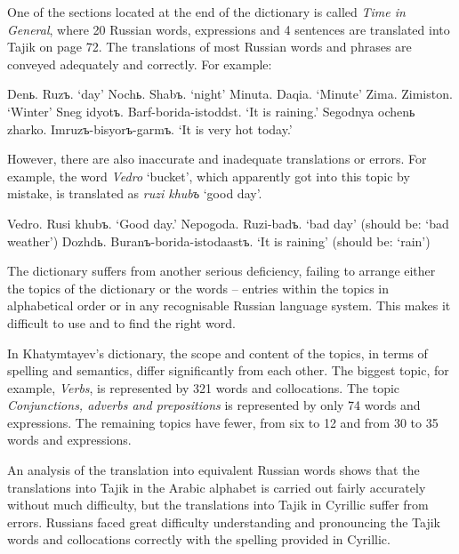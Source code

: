 \documentclass[output=paper,colorlinks,citecolor=brown,arabicfont,chinesefont]{langscibook}
\begin{document}
One of the sections located at the end of the dictionary is called \emph{Time in General}, where 20 Russian words, expressions and 4 sentences are translated into Tajik on page 72. The translations of most Russian words and phrases are conveyed adequately and correctly. For example:

\ea
    \ea Denь. 		Ruzъ.
        \glt `day' 		
    \ex Nochь. 		Shabъ.
        \glt `night'  		 
    \ex Minuta. 		Daqia.
        \glt `Minute' 		
    \ex Zima. 		Zimiston.
        \glt `Winter'  		  
    \ex Sneg idyotъ. 	Barf-borida-istoddst.
        \glt `It is raining.'  
    \ex Segodnya ochenь zharko.  Imruzъ-bisyorъ-garmъ.
        \glt `It is very hot today.' 
    \z
\z

However, there are also inaccurate and inadequate translations or errors. For example, the word \emph{Vedro} `bucket', which apparently got into this topic by mistake, is translated as \textit{ruzi khubъ} `good day'.

\ea
    \ea Vedro. 	Rusi khubъ.
        \glt `Good day.'
    \ex Nepogoda. 	Ruzi-badъ.
        \glt `bad day' (should be: `bad weather')
    \ex Dozhdь. 	Buranъ-borida-istodaastъ.
        \glt `It is raining' (should be: `rain')
    \z
\z

The dictionary suffers from another serious deficiency, failing to arrange either the topics of the dictionary or the words – entries within the topics in alphabetical order or in any recognisable Russian language system. This makes it difficult to use and to find the right word. 

In Khatymtayev’s dictionary, the scope and content of the topics, in terms of spelling and semantics, differ significantly from each other. The biggest topic, for example, \emph{Verbs}, is represented by 321 words and collocations. The topic \emph{Conjunctions, adverbs and prepositions} is represented by only 74 words and expressions. The remaining topics have fewer, from six to 12 and from 30 to 35 words and expressions.

An analysis of the translation into equivalent Russian words shows that the translations into Tajik in the Arabic alphabet is carried out fairly accurately without much difficulty, but the translations into Tajik in Cyrillic suffer from errors. Russians faced great difficulty understanding and pronouncing the Tajik words and collocations correctly with the spelling provided in Cyrillic.
\end{document}
